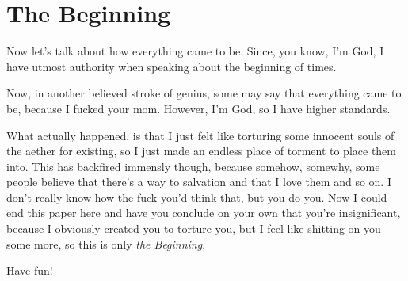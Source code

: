 \section{The Beginning}

Now let's talk about how everything came to be. Since, you know, I'm God, I have utmost authority when speaking about the beginning of times.

Now, in another believed stroke of genius, some may say that everything came to be, because I fucked your mom. However, I'm God, so I have higher standards.

What actually happened, is that I just felt like torturing some innocent souls of the aether for existing, so I just made an endless place of torment to place them into.
This has backfired immensly though, because somehow, somewhy, some people believe that there's a way to salvation and that I love them and so on. I don't really know how the fuck
you'd think that, but you do you. Now I could end this paper here and have you conclude on your own that you're insignificant, because I obviously created you to torture you, but
I feel like shitting on you some more, so this is only \emph{the Beginning}.

\begin{center}
  Have fun!
\end{center}